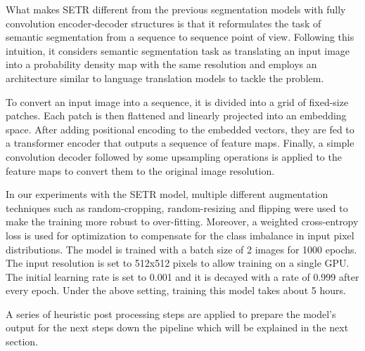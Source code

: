 \documentclass[letterpaper]{article} %
\begin{document}
What makes SETR different from the previous segmentation models with fully convolution encoder-decoder structures is that it reformulates the task of semantic segmentation from a sequence to sequence point of view. Following this intuition, it considers semantic segmentation task as translating an input image into a probability density map with the same resolution and employs an architecture similar to language translation models to tackle the problem.

To convert an input image into a sequence, it is divided into a grid of fixed-size patches. Each patch is then flattened and linearly projected into an embedding space.  After adding positional encoding to the embedded vectors, they are fed to a transformer encoder that outputs a sequence of feature maps. Finally, a simple convolution decoder followed by some upsampling operations is applied to the feature maps to convert them to the original image resolution.


In our experiments with the SETR model, multiple different augmentation techniques such as random-cropping, random-resizing and flipping were used to make the training more robust to over-fitting. Moreover, 
a weighted cross-entropy loss is used for optimization to compensate for the class imbalance in input pixel distributions.
The model is trained with a batch size of 2 images for 1000 epochs. The input resolution is set to 512x512 pixels to allow training on a single GPU. The initial learning rate is set to 0.001 and it is decayed with a rate of 0.999 after every epoch. Under the above setting, training this model takes about 5 hours.

A series of heuristic post processing steps are applied to prepare the model's output for the next steps down the pipeline which will be explained in the next section.
\end{document}
